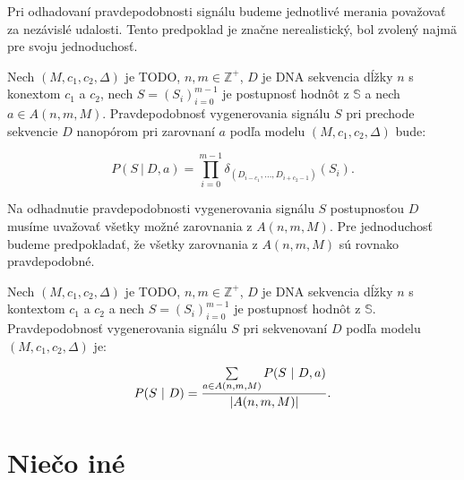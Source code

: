 Pri odhadovaní pravdepodobnosti signálu budeme jednotlivé merania považovať za nezávislé udalosti.
Tento predpoklad je značne nerealistický, bol zvolený najmä pre svoju jednoduchosť.

\begin{definicia}

Nech $(M, c_1, c_2, \Delta)$ je TODO, $n, m \in \mathbb{Z}^+$, $D$ je DNA sekvencia dĺžky $n$ s konextom
$c_1$ a $c_2$, nech $S = (S_i)_{i=0}^{m-1}$ je postupnosť hodnôt z $\mathbb{S}$ a nech 
$a \in A(n, m, M)$. Pravdepodobnosť vygenerovania signálu $S$ pri prechode sekvencie $D$ nanopórom
pri zarovnaní $a$ podľa modelu $(M, c_1, c_2, \Delta)$ bude:

$$P(S ~|~ D, a) = \prod\limits_{i=0}^{m-1} \delta_{(D_{i-c_1}, \dots, D_{i+c_2-1})}(S_i) \text{.}$$

\end{definicia}

Na odhadnutie pravdepodobnosti vygenerovania signálu $S$ postupnosťou $D$ musíme uvažovať všetky možné
zarovnania z $A(n, m, M)$. Pre jednoduchosť budeme predpokladať, že všetky zarovnania z $A(n, m, M)$ sú rovnako pravdepodobné.

\begin{definicia}

Nech $(M, c_1, c_2, \Delta)$ je TODO, $n, m \in \mathbb{Z}^+$, $D$ je DNA sekvencia dĺžky $n$ s kontextom $c_1$ a $c_2$ a nech $S = (S_i)_{i=0}^{m-1}$ je postupnosť hodnôt z $\mathbb{S}$.
Pravdepodobnosť vygenerovania signálu $S$ pri sekvenovaní $D$ podľa modelu $(M, c_1, c_2, \Delta)$ je:

$$P(S ~|~ D) =  \frac{\sum\limits_{a \in A(n, m, M)} P(S ~|~ D, a)}{\abs*{A(n, m, M)}} \text{.}$$
\end{definicia}



\section{Niečo iné}
